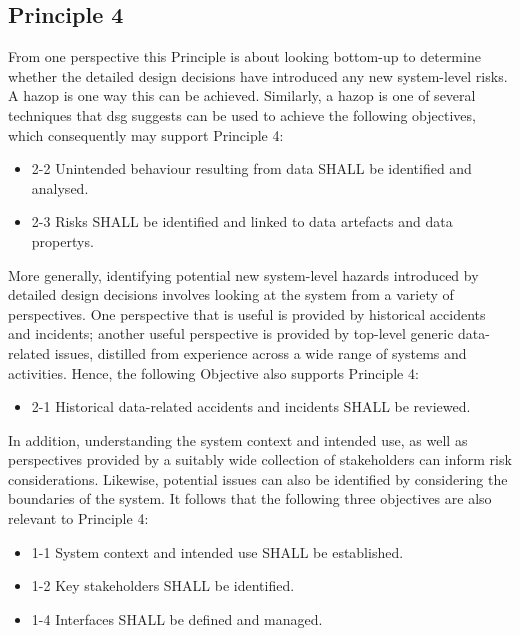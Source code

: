 \subsection{Principle 4}

From one perspective this Principle is about looking bottom-up to determine whether the detailed design decisions have introduced any new system-level risks. A \gls{hazop} is one way this can be achieved. Similarly, a \gls{hazop} is one of several techniques that \gls{dsg} suggests can be used to achieve the following objectives, which consequently may support Principle 4:

\begin{itemize}
	\item \textcolor{dsiwgAccentColour}{2-2} Unintended behaviour resulting from data SHALL be identified and analysed.
	\item \textcolor{dsiwgAccentColour}{2-3} Risks SHALL be identified and linked to \glspl{data artefact} and \glspl{data property}.
\end{itemize}

More generally, identifying potential new system-level hazards introduced by detailed design decisions involves looking at the system from a variety of perspectives. One perspective that is useful is provided by historical accidents and incidents; another useful perspective is provided by top-level generic data-related issues, distilled from experience across a wide range of systems and activities. Hence, the following Objective also supports Principle 4:

\begin{itemize}
	\item \textcolor{dsiwgAccentColour}{2-1} Historical data-related accidents and incidents SHALL be reviewed.
\end{itemize}

In addition, understanding the system context and intended use, as well as perspectives provided by a suitably wide collection of \glspl{stakeholder} can inform risk considerations. Likewise, potential issues can also be identified by considering the boundaries of the system. It follows that the following three objectives are also relevant to Principle 4:

\begin{itemize}
	\item \textcolor{dsiwgAccentColour}{1-1} System context and intended use SHALL be established.
	\item \textcolor{dsiwgAccentColour}{1-2} Key \glspl{stakeholder} SHALL be identified.
	\item \textcolor{dsiwgAccentColour}{1-4} Interfaces SHALL be defined and managed.
\end{itemize}


